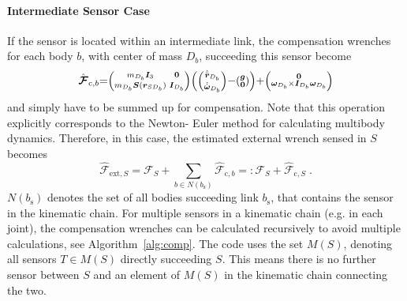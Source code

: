 \paragraph{Intermediate Sensor Case}
If the sensor is located within an intermediate link, the compensation wrenches for each body $b$, with center of mass $D_b$, succeeding this sensor become
%
\begin{equation}
\medmuskip=0mu
\thinmuskip=0mu
\thickmuskip=0mu
\small
\hat{\bm{\mathcal{F}}}_{\mathrm{c},b}=\left(\begin{smallmatrix}
m_{D_b}\bm{I}_3 & \bm{0}\\
m_{D_b}\bm{S}(\bm{r}_{SD_b}) & \bm{I}_{D_b}
\end{smallmatrix}\right)
\left(\left(\begin{smallmatrix}\hat{\ddot{\bm{r}}}_{D_b}\\\hat{\dot{\bm{\omega}}}_{D_b}\end{smallmatrix}\right)-\left(\begin{smallmatrix}
\bm{g}\\\bm{0}
\end{smallmatrix}\right)\right)+\left(\begin{smallmatrix}
\bm{0}\\
\bm{\omega}_{D_b}\times\bm{I}_{D_b}\bm{\omega}_{D_b}
\end{smallmatrix}\right)
\end{equation}
%
and simply have to be summed up for compensation.
Note that this operation explicitly corresponds to the Newton- Euler method for calculating multibody dynamics.
Therefore, in this case, the estimated external wrench sensed in $S$ becomes
%
\begin{equation}
\hat{\bm{\mathcal{F}}}_{\mathrm{ext},S}=\bm{\mathcal{F}}_S+\sum_{b\in N(b_\mathrm{s})}\hat{\bm{\mathcal{F}}}_{\mathrm{c},b}=:\bm{\mathcal{F}}_S+\hat{\bm{\mathcal{F}}}_{\mathrm{c},S}\;.\label{eqn:cmp}
\end{equation}
%
$N(b_\mathrm{s})$ denotes the set of all bodies succeeding link $b_\mathrm{s}$, that contains the sensor in the kinematic chain.
For multiple sensors in a kinematic chain (e.g. in each joint), the compensation wrenches can be calculated recursively to avoid multiple calculations, see Algorithm~\ref{alg:comp}.
The code uses the set $M(S)$, denoting all sensors $T\in M(S)$ directly succeeding $S$.
This means there is no further sensor between $S$ and an element of $M(S)$ in the kinematic chain connecting the two.
%
